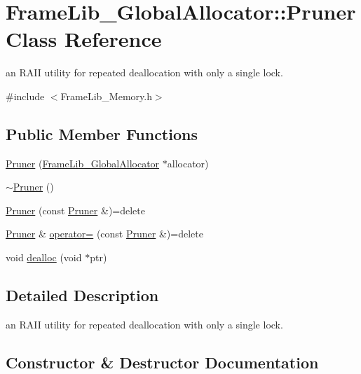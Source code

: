 \hypertarget{class_frame_lib___global_allocator_1_1_pruner}{}\section{Frame\+Lib\+\_\+\+Global\+Allocator\+:\+:Pruner Class Reference}
\label{class_frame_lib___global_allocator_1_1_pruner}


an R\+A\+II utility for repeated deallocation with only a single lock.  




{\ttfamily \#include $<$Frame\+Lib\+\_\+\+Memory.\+h$>$}

\subsection*{Public Member Functions}
\begin{DoxyCompactItemize}
\item 
\hyperlink{class_frame_lib___global_allocator_1_1_pruner_aaeef6460d559456c61e25854f016625c}{Pruner} (\hyperlink{class_frame_lib___global_allocator}{Frame\+Lib\+\_\+\+Global\+Allocator} $\ast$allocator)
\item 
\hyperlink{class_frame_lib___global_allocator_1_1_pruner_af1b947e70e93d005e5a996ea2010e51a}{$\sim$\+Pruner} ()
\item 
\hyperlink{class_frame_lib___global_allocator_1_1_pruner_a39d760f7c11898823f0d6eb8fc9fa996}{Pruner} (const \hyperlink{class_frame_lib___global_allocator_1_1_pruner}{Pruner} \&)=delete
\item 
\hyperlink{class_frame_lib___global_allocator_1_1_pruner}{Pruner} \& \hyperlink{class_frame_lib___global_allocator_1_1_pruner_a223ed75d883318ef6d350ab9ce48bdc2}{operator=} (const \hyperlink{class_frame_lib___global_allocator_1_1_pruner}{Pruner} \&)=delete
\item 
void \hyperlink{class_frame_lib___global_allocator_1_1_pruner_ad261c2fb12e19ce40ed3af4c550c479c}{dealloc} (void $\ast$ptr)
\end{DoxyCompactItemize}


\subsection{Detailed Description}
an R\+A\+II utility for repeated deallocation with only a single lock. 

\subsection{Constructor \& Destructor Documentation}
\mbox{\label{class_frame_lib___global_allocator_1_1_pruner_aaeef6460d559456c61e25854f016625c}} 
